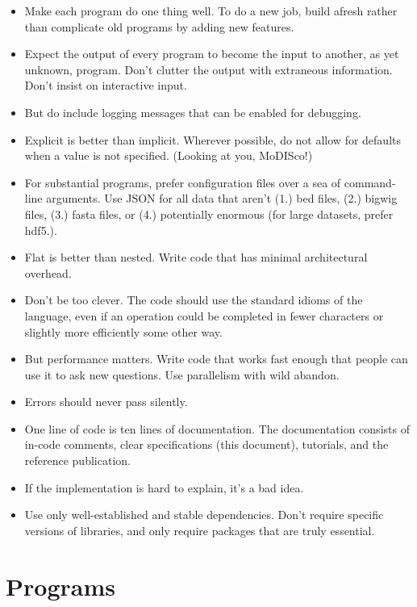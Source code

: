 \documentclass{article}
\begin{document}
\begin{itemize}
    \item Make each program do one thing well. To do a new job, build afresh rather than
        complicate old programs by adding new features.
    \item Expect the output of every program to become the input to another, as yet unknown,
        program. Don't clutter the output with extraneous information. Don't insist on
        interactive input.
    \item But do include logging messages that can be enabled for debugging.
    \item Explicit is better than implicit. Wherever possible, do not allow for defaults when
        a value is not specified.  (Looking at you, MoDISco!)
    \item For substantial programs, prefer configuration files over a sea of command-line
        arguments. Use JSON for all data that aren't (1.) bed files, (2.) bigwig files,
        (3.) fasta files, or (4.) potentially enormous (for large datasets, prefer hdf5.).
    \item Flat is better than nested. Write code that has minimal architectural overhead.
    \item Don't be too clever. The code should use the standard idioms of the language, even if
        an operation could be completed in fewer characters or slightly more efficiently
        some other way.
    \item But performance matters. Write code that works fast enough that people can use it
        to ask new questions. Use parallelism with wild abandon.
    \item Errors should never pass silently.
    \item One line of code is ten lines of documentation. The documentation consists of in-code
        comments, clear specifications (this document), tutorials, and the reference publication.
    \item If the implementation is hard to explain, it's a bad idea.
    \item Use only well-established and stable dependencies. Don't require specific versions of
        libraries, and only require packages that are truly essential.
\end{itemize}

\newpage

\section{Programs}
\end{document}
